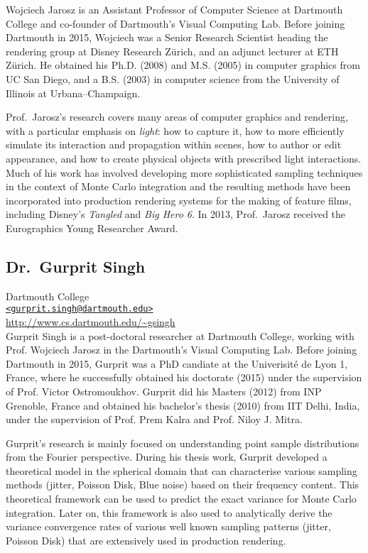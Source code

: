 \documentclass[11pt,fleqn]{book} %
\begin{document}
Wojciech Jarosz is an Assistant Professor of Computer Science at Dartmouth College and co-founder of Dartmouth's Visual Computing Lab. Before joining Dartmouth in 2015, Wojciech was a Senior Research Scientist heading the rendering group at Disney Research Zürich, and an adjunct lecturer at ETH Zürich. He obtained his Ph.D. (2008) and M.S. (2005) in computer graphics from UC San Diego, and a B.S. (2003) in computer science from the University of Illinois at Urbana–Champaign.

Prof.\ Jarosz’s research covers many areas of computer graphics and rendering, with a particular emphasis on \emph{light}: how to capture it, how to more efficiently simulate its interaction and propagation within scenes, how to author or edit appearance, and how to create physical objects with prescribed light interactions. Much of his work has involved developing more sophisticated sampling techniques in the context of Monte Carlo integration and the resulting methods have been incorporated into production rendering systems for the making of feature films, including Disney's \textit{Tangled} and \textit{Big Hero 6}. In 2013, Prof.\ Jarosz received the Eurographics Young Researcher Award.

\bigskip

\subsection*{Dr.\ Gurprit Singh}
Dartmouth College\\
\href{mailto:gurprit.singh@dartmouth.edu}{\texttt{<gurprit.singh@dartmouth.edu>}}\\
\url{http://www.cs.dartmouth.edu/~gsingh}\\

Gurprit Singh is a post-doctoral researcher at Dartmouth College, working with Prof. Wojciech Jarosz in the Dartmouth's Visual Computing Lab. Before joining Dartmouth in 2015, Gurprit was a PhD candiate 
at the Univerisit\'{e} de Lyon 1, France, where he successfully obtained his doctorate (2015) under the 
supervision of Prof. Victor Ostromoukhov. Gurprit did his Masters (2012) from INP Grenoble, France and 
obtained his bachelor's thesis (2010) from IIT Delhi, India, under the supervision of Prof. Prem Kalra and Prof. Niloy J. Mitra.

Gurprit's research is mainly focused on understanding point sample distributions from the Fourier perspective. During his thesis work, Gurprit developed a theoretical model in the spherical domain that can characterise various sampling methods (jitter, Poisson Disk, Blue noise) based on their frequency content. This theoretical framework can be used to predict the exact variance for Monte Carlo integration. Later on, this framework is also used to analytically derive the variance convergence rates 
of various well known sampling patterns (jitter, Poisson Disk) that are extensively used in production rendering.
\cleardoublepage
\end{document}

